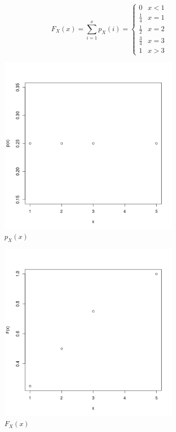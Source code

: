 \documentclass[10pt, letterpaper]{paper}
\begin{document}
$$F_X(x) = \sum_{i = 1}^{x} p_X (i) = \begin{cases} 
		0 		  & x < 1\\
      \frac{1}{4} & x = 1 \\
      \frac{1}{2} & x = 2 \\
      \frac{3}{4} & x = 3 \\
      1 & x > 3
   \end{cases}$$
   
\begin{figure}[h!]
\includegraphics[width=0.8\textwidth]{pmfPlots.png}
\caption{ $p_X (x)$ }
\end{figure}

\begin{figure}[h!]
\includegraphics[width=0.8\textwidth]{CumDistPlot.png}
\caption{ $F_X (x)$ }
\end{figure}
   
\end{document}
